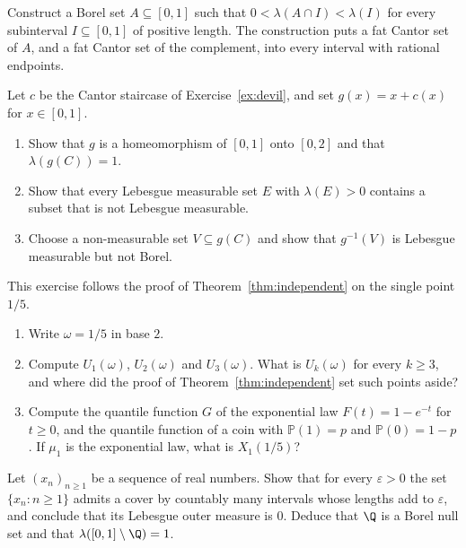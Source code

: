 \begin{exercise}[$\star\star\star$]\label{ex:everywhere}
Construct a Borel set $A\subseteq[0,1]$ such that $0<\lambda(A\cap I)<\lambda(I)$ for every subinterval $I\subseteq[0,1]$ of positive length.
The construction puts a fat Cantor set of $A$, and a fat Cantor set of the complement, into every interval with rational endpoints.
\end{exercise}

\begin{exercise}[$\star\star\star$]\label{ex:nonborel}
Let $c$ be the Cantor staircase of Exercise~\ref{ex:devil}, and set $g(x)=x+c(x)$ for $x\in[0,1]$.
\begin{enumerate}[label=(\alph*)]
\item Show that $g$ is a homeomorphism of $[0,1]$ onto $[0,2]$ and that $\lambda(g(C))=1$.
\item Show that every Lebesgue measurable set $E$ with $\lambda(E)>0$ contains a subset that is not Lebesgue measurable.
\item Choose a non-measurable set $V\subseteq g(C)$ and show that $g^{-1}(V)$ is Lebesgue measurable but not Borel.
\end{enumerate}
\end{exercise}

\begin{exercise}[$\star$]\label{ex:dealing}
This exercise follows the proof of Theorem~\ref{thm:independent} on the single point $1/5$.
\begin{enumerate}[label=(\alph*)]
\item Write $\omega=1/5$ in base $2$.
\item Compute $U_1(\omega)$, $U_2(\omega)$ and $U_3(\omega)$.
What is $U_k(\omega)$ for every $k\ge3$, and where did the proof of Theorem~\ref{thm:independent} set such points aside?
\item Compute the quantile function $G$ of the exponential law $F(t)=1-e^{-t}$ for $t\ge0$, and the quantile function of a coin with $\mathbb P(1)=p$ and $\mathbb P(0)=1-p$.
If $\mu_1$ is the exponential law, what is $X_1(1/5)$?
\end{enumerate}
\end{exercise}

\begin{exercise}[$\star$]\label{ex:v7c07a}
Let $(x_n)_{n\ge1}$ be a sequence of real numbers.
Show that for every $\varepsilon>0$ the set $\{x_n:n\ge1\}$ admits a cover by countably many intervals whose lengths add to $\varepsilon$, and conclude that its Lebesgue outer measure is $0$.
Deduce that $\Q$ is a Borel null set and that $\lambda([0,1]\setminus\Q)=1$.
\end{exercise}

